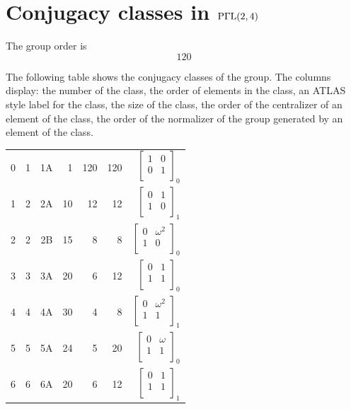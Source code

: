 \section*{Conjugacy classes in ${\rm P}\Gamma {\rm L}(2,4)$}
The group order is 
$$
120
$$

\bigskip

The following table shows the conjugacy classes of the group. The columns display: the number of the class, the order of elements in the class, an ATLAS style label for the class, the size of the class, the order of the centralizer of an element of the class, the order of the normalizer of the group generated by an element of the class.\\

\bigskip

\begin{center}
\begin{tabular}{*{7}{r}}
0 & 1 & 1A & 1 & 120 & 120 & $\left[
\begin{array}{*{2}{r}}
1 & 0\\
0 & 1\\
\end{array}
\right]
_{0}
$\\
1 & 2 & 2A & 10 & 12 & 12 & $\left[
\begin{array}{*{2}{r}}
0 & 1\\
1 & 0\\
\end{array}
\right]
_{1}
$\\
2 & 2 & 2B & 15 & 8 & 8 & $\left[
\begin{array}{*{2}{r}}
0 & \omega^{2}\\
1 & 0\\
\end{array}
\right]
_{0}
$\\
3 & 3 & 3A & 20 & 6 & 12 & $\left[
\begin{array}{*{2}{r}}
0 & 1\\
1 & 1\\
\end{array}
\right]
_{0}
$\\
4 & 4 & 4A & 30 & 4 & 8 & $\left[
\begin{array}{*{2}{r}}
0 & \omega^{2}\\
1 & 1\\
\end{array}
\right]
_{1}
$\\
5 & 5 & 5A & 24 & 5 & 20 & $\left[
\begin{array}{*{2}{r}}
0 & \omega \\
1 & 1\\
\end{array}
\right]
_{0}
$\\
6 & 6 & 6A & 20 & 6 & 12 & $\left[
\begin{array}{*{2}{r}}
0 & 1\\
1 & 1\\
\end{array}
\right]
_{1}
$\\
\end{tabular}
\end{center}
